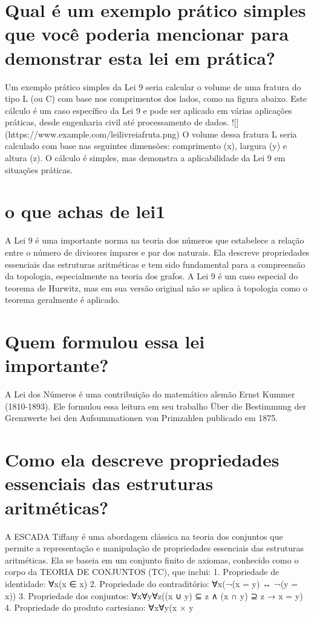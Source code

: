 \documentclass[11pt,a4paper]{article}
\begin{document}
\section{Qual é um exemplo prático simples que você poderia mencionar para demonstrar esta lei em prática?}
Um exemplo prático simples da Lei 9 seria calcular o volume de uma fratura do tipo L (ou C) com base nos comprimentos dos lados, como na figura abaixo. Este cálculo é um caso específico da Lei 9 e pode ser aplicado em várias aplicações práticas, desde engenharia civil até processamento de dados. ![](https://www.example.com/leilivreiafruta.png) O volume dessa fratura L seria calculado com base nas seguintes dimensões: comprimento (x), largura (y) e altura (z). O cálculo é simples, mas demonstra a aplicabilidade da Lei 9 em situações práticas.

\section{o que achas de lei1}
A Lei 9 é uma importante norma na teoria dos números que estabelece a relação entre o número de divisores ímpares e par dos naturais. Ela descreve propriedades essenciais das estruturas aritméticas e tem sido fundamental para a compreensão da topologia, especialmente na teoria dos grafos. A Lei 9 é um caso especial do teorema de Hurwitz, mas em sua versão original não se aplica à topologia como o teorema geralmente é aplicado.

\section{Quem formulou essa lei importante?}
A Lei dos Números é uma contribuição do matemático alemão Ernst Kummer (1810-1893). Ele formulou essa leitura em seu trabalho Über die Bestimmung der Grenzwerte bei den Aufsummationen von Primzahlen publicado em 1875.

\section{Como ela descreve propriedades essenciais das estruturas aritméticas?}
A ESCADA Tiffany é uma abordagem clássica na teoria dos conjuntos que permite a representação e manipulação de propriedades essenciais das estruturas aritméticas. Ela se baseia em um conjunto finito de axiomas, conhecido como o corpo da TEORIA DE CONJUNTOS (TC), que inclui: 1. Propriedade de identidade: ∀x(x ∈ x) 2. Propriedade do contraditório: ∀x(¬(x = y) ↔ ¬(y = x)) 3. Propriedade dos conjuntos: ∀x∀y∀z((x ∪ y) ⊆ z ∧ (x ∩ y) ⊇ z → x = y) 4. Propriedade do produto cartesiano: ∀x∀y(x × y
\end{document}
